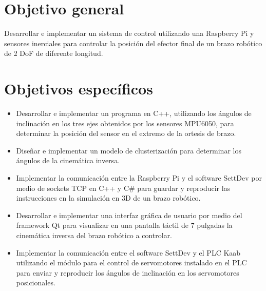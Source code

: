 \section{Objetivo general}

Desarrollar e implementar un sistema de control utilizando una Raspberry Pi y sensores inerciales para controlar la posición del efector final de un brazo robótico de 2 DoF de diferente longitud.

\newpage
\section{Objetivos específicos}
\begin{itemize}
	
	\item Desarrollar e implementar un programa en C++, utilizando los ángulos de inclinación en los tres ejes obtenidos por los sensores MPU6050, para determinar la posición del sensor en el extremo de la ortesis de brazo.
	
	\item Diseñar e implementar un modelo de clusterización para determinar los ángulos de la cinemática inversa.
	
	\item Implementar la comunicación entre la Raspberry Pi y el software SettDev por medio de sockets TCP en C++ y C\# para guardar y reproducir las instrucciones en la simulación en 3D de un brazo robótico.
	
	\item Desarrollar e implementar una interfaz gráfica de usuario por medio del framework Qt para visualizar en una pantalla táctil de 7 pulgadas la cinemática inversa del brazo robótico a controlar.
	
	\item Implementar la comunicación entre el software SettDev y el PLC Kaab utilizando el módulo para el control de servomotores instalado en el PLC para enviar y reproducir los ángulos de inclinación en los servomotores posicionales.
	
\end{itemize}
